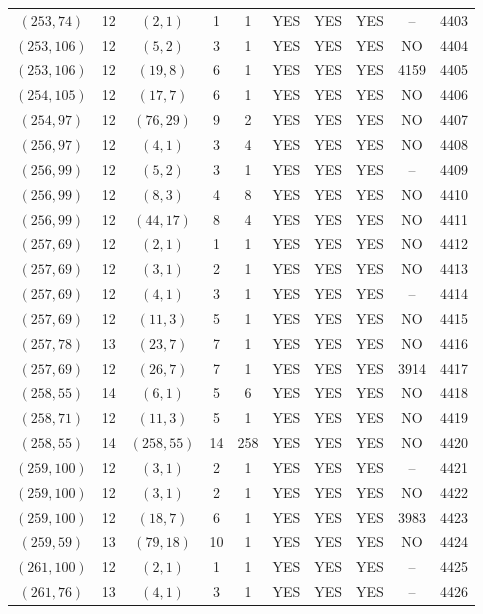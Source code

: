 \begin{longtable}{|c|c|c|c|c|c|c|c|c|c|}
$(253, 74)$ & 12 & $(2, 1)$ & 1 & 1 & YES & YES & YES & -- & 4403\\
$(253, 106)$ & 12 & $(5, 2)$ & 3 & 1 & YES & YES & YES & NO & 4404\\
$(253, 106)$ & 12 & $(19, 8)$ & 6 & 1 & YES & YES & YES & 4159 & 4405\\
$(254, 105)$ & 12 & $(17, 7)$ & 6 & 1 & YES & YES & YES & NO & 4406\\
$(254, 97)$ & 12 & $(76, 29)$ & 9 & 2 & YES & YES & YES & NO & 4407\\
$(256, 97)$ & 12 & $(4, 1)$ & 3 & 4 & YES & YES & YES & NO & 4408\\
$(256, 99)$ & 12 & $(5, 2)$ & 3 & 1 & YES & YES & YES & -- & 4409\\
$(256, 99)$ & 12 & $(8, 3)$ & 4 & 8 & YES & YES & YES & NO & 4410\\
$(256, 99)$ & 12 & $(44, 17)$ & 8 & 4 & YES & YES & YES & NO & 4411\\
$(257, 69)$ & 12 & $(2, 1)$ & 1 & 1 & YES & YES & YES & NO & 4412\\
$(257, 69)$ & 12 & $(3, 1)$ & 2 & 1 & YES & YES & YES & NO & 4413\\
$(257, 69)$ & 12 & $(4, 1)$ & 3 & 1 & YES & YES & YES & -- & 4414\\
$(257, 69)$ & 12 & $(11, 3)$ & 5 & 1 & YES & YES & YES & NO & 4415\\
$(257, 78)$ & 13 & $(23, 7)$ & 7 & 1 & YES & YES & YES & NO & 4416\\
$(257, 69)$ & 12 & $(26, 7)$ & 7 & 1 & YES & YES & YES & 3914 & 4417\\
$(258, 55)$ & 14 & $(6, 1)$ & 5 & 6 & YES & YES & YES & NO & 4418\\
$(258, 71)$ & 12 & $(11, 3)$ & 5 & 1 & YES & YES & YES & NO & 4419\\
$(258, 55)$ & 14 & $(258, 55)$ & 14 & 258 & YES & YES & YES & NO & 4420\\
$(259, 100)$ & 12 & $(3, 1)$ & 2 & 1 & YES & YES & YES & -- & 4421\\
$(259, 100)$ & 12 & $(3, 1)$ & 2 & 1 & YES & YES & YES & NO & 4422\\
$(259, 100)$ & 12 & $(18, 7)$ & 6 & 1 & YES & YES & YES & 3983 & 4423\\
$(259, 59)$ & 13 & $(79, 18)$ & 10 & 1 & YES & YES & YES & NO & 4424\\
$(261, 100)$ & 12 & $(2, 1)$ & 1 & 1 & YES & YES & YES & -- & 4425\\
$(261, 76)$ & 13 & $(4, 1)$ & 3 & 1 & YES & YES & YES & -- & 4426\\

\end{longtable}
